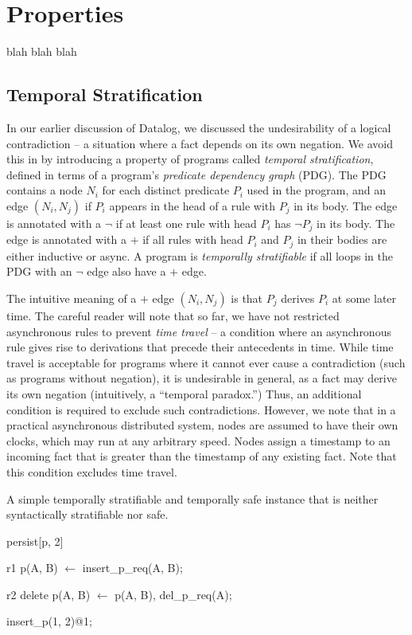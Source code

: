 \section{Properties}

blah blah blah

\subsection{Temporal Stratification}

In our earlier discussion of Datalog, we discussed the undesirability of a logical contradiction -- a situation where a fact depends on its own negation.  We avoid this in \lang by introducing a property of programs called {\em temporal stratification}, defined in terms of a program's {\em predicate dependency graph} (PDG).  The PDG contains a node $N_i$ for each distinct predicate $P_i$ used in the program, and an edge $(N_i, N_j)$ if $P_i$ appears in the head of a rule with $P_j$ in its body.  The edge is annotated with a $\lnot$ if at least one rule with head $P_i$ has $\lnot P_j$ in its body.  The edge is annotated with a $+$ if all rules with head $P_i$ and $P_j$ in their bodies are either inductive or async.  A \lang program is {\em temporally stratifiable} if all loops in the PDG with an $\lnot$ edge also have a $+$ edge.

The intuitive meaning of a $+$ edge $(N_i, N_j)$ is that $P_j$ derives $P_i$ at some later time.  The careful reader will note that so far, we have not restricted asynchronous rules to prevent {\em time travel} -- a condition where an asynchronous rule gives rise to derivations that precede their antecedents in time.  While time travel is acceptable for programs where it cannot ever cause a contradiction (such as programs without negation), it is undesirable in general, as a fact may derive its own negation (intuitively, a ``temporal paradox.'')  Thus, an additional condition is required to exclude such contradictions.  However, we note that in a practical asynchronous distributed system, nodes are assumed to have their own clocks, which may run at any arbitrary speed.  Nodes assign a timestamp to an incoming fact that is greater than the timestamp of any existing fact.  Note that this condition excludes time travel.

\begin{example}
\label{ex:stratsafe}
A simple temporally stratifiable and temporally safe \slang instance that is neither syntactically stratifiable nor safe.

\begin{Dedalus}
persist[p, 2]  
  
r1
p(A, B) \(\leftarrow\)
  insert\_p\_req(A, B);

r2  
delete p(A, B) \(\leftarrow\)
  p(A, B),
  del\_p\_req(A);

insert\_p(1, 2)@1;
\end{Dedalus}
\end{example}

